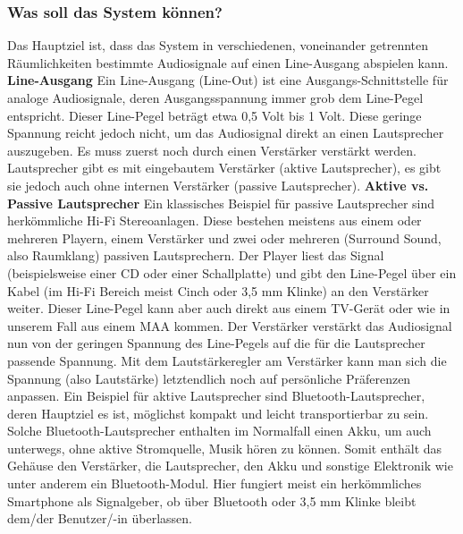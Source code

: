 \documentclass[11pt, twoside]{article}
\begin{document}
\subsubsection{Was soll das System können?}
Das Hauptziel ist, dass das System in verschiedenen, voneinander getrennten Räumlichkeiten bestimmte Audiosignale auf einen Line-Ausgang abspielen kann.
\vspace{4mm}\newline
\textbf{Line-Ausgang}\newline
Ein Line-Ausgang (Line-Out) ist eine Ausgangs-Schnittstelle für analoge Audiosignale, deren Ausgangsspannung immer grob dem Line-Pegel entspricht. Dieser \glqq Line-Pegel beträgt etwa 0,5 Volt bis 1 Volt\grqq{}. \parencite{noauthor_urlnl01_nodate} \newline
Diese geringe Spannung reicht jedoch nicht, um das Audiosignal direkt an einen Lautsprecher auszugeben. Es muss zuerst noch durch einen Verstärker verstärkt werden. Lautsprecher gibt es mit eingebautem Verstärker (aktive Lautsprecher), es gibt sie jedoch auch ohne internen Verstärker (passive Lautsprecher). \parencite[vgl.][]{noauthor_urlnl01_nodate}
\vspace{4mm}\newline
\textbf{Aktive vs. Passive Lautsprecher}\newline
Ein klassisches Beispiel für passive Lautsprecher sind herkömmliche Hi-Fi Stereoanlagen. Diese bestehen meistens aus einem oder mehreren Playern, einem Verstärker und zwei oder mehreren (Surround Sound, also Raumklang) passiven Lautsprechern. Der Player liest das Signal (beispielsweise einer CD oder einer Schallplatte) und gibt den Line-Pegel über ein Kabel (im Hi-Fi Bereich meist Cinch oder 3,5 mm Klinke) an den Verstärker weiter. Dieser Line-Pegel kann aber auch direkt aus einem TV-Gerät oder wie in unserem Fall aus einem MAA kommen. Der Verstärker verstärkt das Audiosignal nun von der geringen Spannung des Line-Pegels auf die für die Lautsprecher passende Spannung. Mit dem Lautstärkeregler am Verstärker kann man sich die Spannung (also Lautstärke) letztendlich noch auf persönliche Präferenzen anpassen. \newline
Ein Beispiel für aktive Lautsprecher sind Bluetooth-Lautsprecher, deren Hauptziel es ist, möglichst kompakt und leicht transportierbar zu sein. Solche Bluetooth-Lautsprecher enthalten im Normalfall einen Akku, um auch unterwegs, ohne aktive Stromquelle, Musik hören zu können. Somit enthält das Gehäuse den Verstärker, die Lautsprecher, den Akku und sonstige Elektronik wie unter anderem ein Bluetooth-Modul. Hier fungiert meist ein herkömmliches Smartphone als Signalgeber, ob über Bluetooth oder 3,5 mm Klinke bleibt dem/der Benutzer/-in überlassen.\newline
\end{document}
